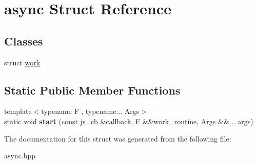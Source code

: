 \hypertarget{structasync}{}\section{async Struct Reference}
\label{structasync}
\subsection*{Classes}
\begin{DoxyCompactItemize}
\item 
struct \hyperlink{structasync_1_1work}{work}
\end{DoxyCompactItemize}
\subsection*{Static Public Member Functions}
\begin{DoxyCompactItemize}
\item 
\mbox{\label{structasync_a888d644635083c1d3bf8eb160c3935ac}} 
{\footnotesize template$<$typename F , typename... Args$>$ }\\static void {\bfseries start} (const js\+\_\+cb \&callback, F \&\&work\+\_\+routine, Args \&\&... args)
\end{DoxyCompactItemize}


The documentation for this struct was generated from the following file\+:\begin{DoxyCompactItemize}
\item 
async.\+hpp\end{DoxyCompactItemize}
